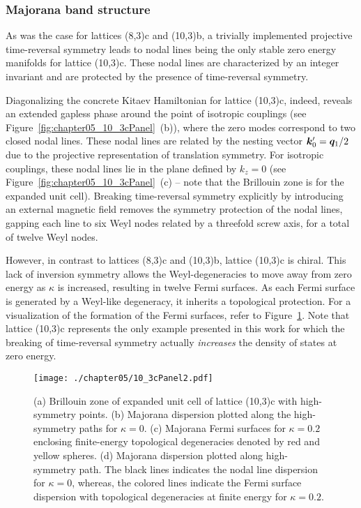 %
%
\subsubsection{Majorana band structure}
%
%
As was the case for lattices (8,3)c and (10,3)b, a trivially implemented projective time-reversal symmetry leads to nodal lines being the only stable zero energy manifolds for lattice (10,3)c.
These nodal lines are characterized by an integer invariant and are protected by the presence of time-reversal symmetry.

Diagonalizing the concrete Kitaev Hamiltonian for lattice (10,3)c, indeed, reveals an extended gapless phase around the point of isotropic couplings (see Figure~\ref{fig:chapter05_10_3cPanel}~(b)), where the zero modes correspond to two closed nodal lines.
These nodal lines are related by the nesting vector $\bm{k}'_0 = \bm{q}_1 / 2$ due to the projective representation of translation symmetry.
For isotropic couplings, these nodal lines lie in the plane defined by $k_z = 0$ (see Figure~\ref{fig:chapter05_10_3cPanel}~(c) -- note that the Brillouin zone is for the expanded unit cell).
Breaking time-reversal symmetry explicitly by introducing an external magnetic field removes the symmetry protection of the nodal lines, gapping each line to six Weyl nodes related by a threefold screw axis, for a total of twelve Weyl nodes.

However, in contrast to lattices (8,3)c and (10,3)b, lattice (10,3)c is chiral.
This lack of inversion symmetry allows the Weyl-degeneracies to move away from zero energy as $\kappa$ is increased, resulting in twelve Fermi surfaces.
As each Fermi surface is generated by a Weyl-like degeneracy, it inherits a topological protection.
For a visualization of the formation of the Fermi surfaces, refer to Figure~\ref{fig:chapter05_10_3cPanel2}.
Note that lattice (10,3)c represents the only example presented in this work for which the breaking of time-reversal symmetry actually \textit{increases} the density of states at zero energy.
%
\begin{figure}[tb]
	\centering
	\texttt{[image: ./chapter05/10\_3cPanel2.pdf]}
	\caption{
		(a) Brillouin zone of expanded unit cell of lattice (10,3)c with high-symmetry points.
		(b) Majorana dispersion plotted along the high-symmetry paths for $\kappa = 0$.
		(c) Majorana Fermi surfaces for $\kappa = 0.2$ enclosing finite-energy topological degeneracies denoted by red and yellow spheres.
		(d) Majorana dispersion plotted along high-symmetry path.
		The black lines indicates the nodal line dispersion for $\kappa = 0$, whereas, the colored lines indicate the Fermi surface dispersion with topological degeneracies at finite energy for $\kappa = 0.2$.
	}
	\label{fig:chapter05_10_3cPanel2}
\end{figure}
%


